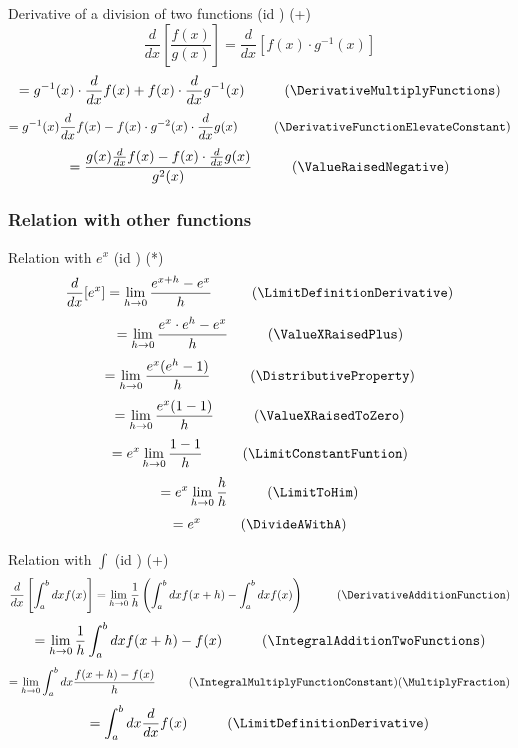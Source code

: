 \documentclass{book}
\begin{document}
                    Derivative of a division of two functions (id \DerivativeDivisionTwoFunctions) (+)
                    \[\frac{d}{dx} \left[\frac{f(x)}{g(x)}\right] = \frac{d}{dx} [f(x) \cdot g^{-1}(x)]\]
                    \[= g^{-1}(x) \cdot \frac{d}{dx}f(x) + f(x) \cdot \frac{d}{dx} g^{-1}(x) \hspace{1cm} (\DerivativeMultiplyFunctions)\]
                    \[= g^{-1}(x) \frac{d}{dx} f(x) - f(x) \cdot g^{-2}(x) \cdot \frac{d}{dx}g(x) \hspace{1cm} (\DerivativeFunctionElevateConstant)\]
                    \[= \frac{g(x) \frac{d}{dx} f(x) - f(x) \cdot \frac{d}{dx} g(x)}{g^2(x)} \hspace{1cm} (\ValueRaisedNegative)\]

                \subsubsection{Relation with other functions}
                    Relation with $e^x$ (id \DerivateRelationEX) (*)
                    \[\frac{d}{dx}[e^x] = \lim_{h \rightarrow 0} \frac{e^{x + h} - e^x}{h} \hspace{1cm} (\LimitDefinitionDerivative)\]
                    \[= \lim_{h \rightarrow 0} \frac{e^x \cdot e^h - e^x}{h} \hspace{1cm} (\ValueXRaisedPlus)\]
                    \[= \lim_{h \rightarrow 0} \frac{e^x (e^h - 1)}{h} \hspace{1cm} (\DistributiveProperty)\]
                    \[= \lim_{h \rightarrow 0} \frac{e^x(1 - 1)}{h} \hspace{1cm} (\ValueXRaisedToZero)\]
                    \[= e^x \lim_{h \rightarrow 0} \frac{1 - 1}{h} \hspace{1cm} (\LimitConstantFuntion)\]
                    \[= e^x \lim_{h \rightarrow 0} \frac{h}{h} \hspace{1cm} (\LimitToHim)\]
                    \[= e^x \hspace{1cm} (\DivideAWithA)\]

                    Relation with $\int$ (id \DerivationRelationIntegral) (+)
                    \[\frac{d}{dx} \left[\int^b_a dx f(x) \right] = \lim_{h \rightarrow 0} \frac{1}{h} \left(\int^b_a dx f(x + h) - \int^b_a dx f(x) \right) \hspace{1cm} (\DerivativeAdditionFunction)\]
                    \[= \lim_{h \rightarrow 0} \frac{1}{h} \int^b_a dx f(x + h) - f(x) \hspace{1cm} (\IntegralAdditionTwoFunctions)\]
                    \[= \lim_{h \rightarrow 0} \int^b_a dx \frac{f(x + h) - f(x)}{h} \hspace{1cm} (\IntegralMultiplyFunctionConstant)(\MultiplyFraction)\]
                    \[= \int^b_a dx \frac{d}{dx} f(x) \hspace{1cm} (\LimitDefinitionDerivative)\]
\end{document}
